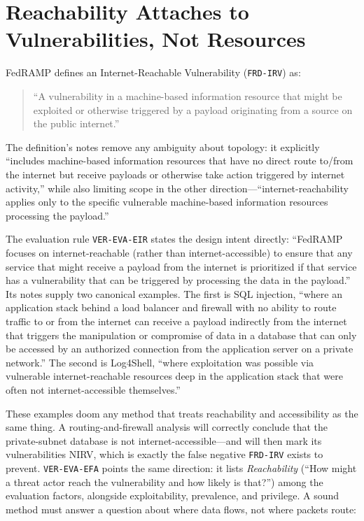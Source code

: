 \documentclass[11pt]{article}
\newcommand{\code}[1]{\texttt{#1}}
\begin{document}
\section{Reachability Attaches to Vulnerabilities, Not Resources}
\label{sec:vuln-not-resource}
FedRAMP defines an Internet-Reachable Vulnerability (\code{FRD-IRV}) as:
\begin{quote}
``A vulnerability in a machine-based information resource that might be exploited or otherwise triggered by a payload originating from a source on the public internet.''
\end{quote}
The definition's notes remove any ambiguity about topology: it explicitly ``includes machine-based information resources that have no direct route to/from the internet but receive payloads or otherwise take action triggered by internet activity,'' while also limiting scope in the other direction---``internet-reachability applies only to the specific vulnerable machine-based information resources processing the payload.''

The evaluation rule \code{VER-EVA-EIR} states the design intent directly: ``FedRAMP focuses on internet-reachable (rather than internet-accessible) to ensure that any service that might receive a payload from the internet is prioritized if that service has a vulnerability that can be triggered by processing the data in the payload.'' Its notes supply two canonical examples. The first is SQL injection, ``where an application stack behind a load balancer and firewall with no ability to route traffic to or from the internet can receive a payload indirectly from the internet that triggers the manipulation or compromise of data in a database that can only be accessed by an authorized connection from the application server on a private network.'' The second is Log4Shell, ``where exploitation was possible via vulnerable internet-reachable resources deep in the application stack that were often not internet-accessible themselves.''

These examples doom any method that treats reachability and accessibility as the same thing. A routing-and-firewall analysis will correctly conclude that the private-subnet database is not internet-accessible---and will then mark its vulnerabilities NIRV, which is exactly the false negative \code{FRD-IRV} exists to prevent. \code{VER-EVA-EFA} points the same direction: it lists \emph{Reachability} (``How might a threat actor reach the vulnerability and how likely is that?'') among the evaluation factors, alongside exploitability, prevalence, and privilege. A sound method must answer a question about where data flows, not where packets route:
\end{document}

